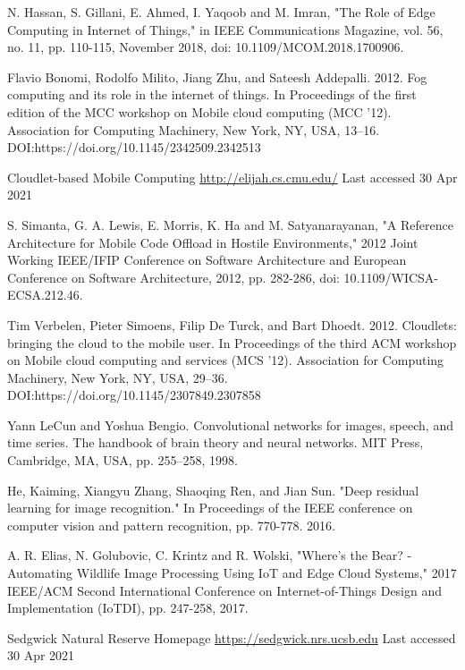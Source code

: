 \documentclass[runningheads]{llncs}
\begin{document}
\begin{thebibliography}{8}

N. Hassan, S. Gillani, E. Ahmed, I. Yaqoob and M. Imran, "The Role of Edge Computing in Internet of Things," in IEEE Communications Magazine, vol. 56, no. 11, pp. 110-115, November 2018, doi: 10.1109/MCOM.2018.1700906.

Flavio Bonomi, Rodolfo Milito, Jiang Zhu, and Sateesh Addepalli. 2012. Fog computing and its role in the internet of things. In Proceedings of the first edition of the MCC workshop on Mobile cloud computing (MCC '12). Association for Computing Machinery, New York, NY, USA, 13–16. DOI:https://doi.org/10.1145/2342509.2342513

Cloudlet-based Mobile Computing
\url {http://elijah.cs.cmu.edu/} Last accessed 30 Apr 2021

S. Simanta, G. A. Lewis, E. Morris, K. Ha and M. Satyanarayanan, "A Reference Architecture for Mobile Code Offload in Hostile Environments," 2012 Joint Working IEEE/IFIP Conference on Software Architecture and European Conference on Software Architecture, 2012, pp. 282-286, doi: 10.1109/WICSA-ECSA.212.46.

Tim Verbelen, Pieter Simoens, Filip De Turck, and Bart Dhoedt. 2012. Cloudlets: bringing the cloud to the mobile user. In Proceedings of the third ACM workshop on Mobile cloud computing and services (MCS '12). Association for Computing Machinery, New York, NY, USA, 29–36. DOI:https://doi.org/10.1145/2307849.2307858



Yann LeCun and Yoshua Bengio. Convolutional networks for images, speech, and time series. The handbook of brain theory and neural networks. MIT Press, Cambridge, MA, USA, pp. 255–258, 1998.

He, Kaiming, Xiangyu Zhang, Shaoqing Ren, and Jian Sun. "Deep residual learning for image recognition." In Proceedings of the IEEE conference on computer vision and pattern recognition, pp. 770-778. 2016.

A. R. Elias, N. Golubovic, C. Krintz and R. Wolski, "Where's the Bear? - Automating Wildlife Image Processing Using IoT and Edge Cloud Systems," 2017 IEEE/ACM Second International Conference on Internet-of-Things Design and Implementation (IoTDI), pp. 247-258, 2017.

Sedgwick Natural Reserve Homepage \url{https://sedgwick.nrs.ucsb.edu} Last accessed 30 Apr 2021



\end{thebibliography}
\end{document}
